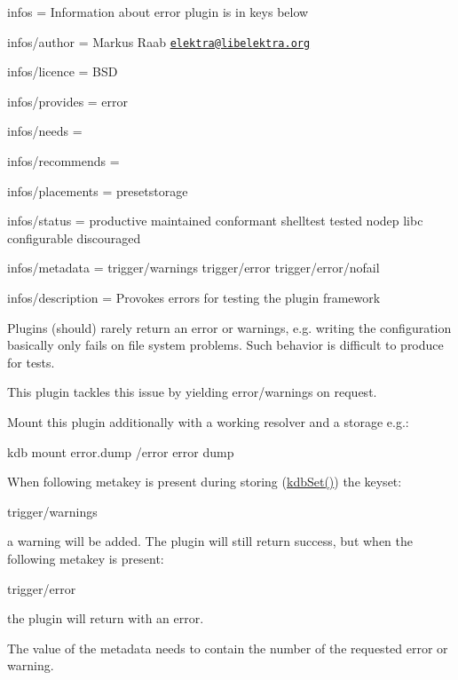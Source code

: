 
\begin{DoxyItemize}
\item infos = Information about error plugin is in keys below
\item infos/author = Markus Raab \href{mailto:elektra@libelektra.org}{\tt elektra@libelektra.\+org}
\item infos/licence = B\+SD
\item infos/provides = error
\item infos/needs =
\item infos/recommends =
\item infos/placements = presetstorage
\item infos/status = productive maintained conformant shelltest tested nodep libc configurable discouraged
\item infos/metadata = trigger/warnings trigger/error trigger/error/nofail
\item infos/description = Provokes errors for testing the plugin framework
\end{DoxyItemize}

Plugins (should) rarely return an error or warnings, e.\+g. writing the configuration basically only fails on file system problems. Such behavior is difficult to produce for tests.

This plugin tackles this issue by yielding error/warnings on request.

Mount this plugin additionally with a working resolver and a storage e.\+g.\+:


\begin{DoxyCode}
kdb mount error.dump /error error dump
\end{DoxyCode}


When following metakey is present during storing ({\ttfamily \hyperlink{group__kdb_ga11436b058408f83d303ca5e996832bcf}{kdb\+Set()}}) the keyset\+:


\begin{DoxyCode}
trigger/warnings
\end{DoxyCode}


a warning will be added. The plugin will still return success, but when the following metakey is present\+:


\begin{DoxyCode}
trigger/error
\end{DoxyCode}


the plugin will return with an error.

The value of the metadata needs to contain the number of the requested error or warning.


